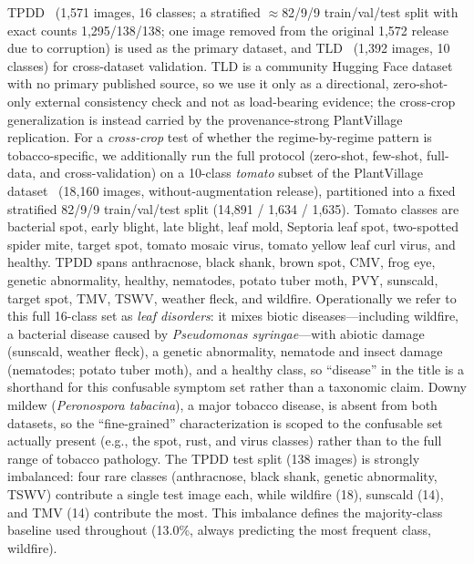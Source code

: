 \documentclass[10pt,a4paper]{article}
\begin{document}
TPDD~\cite{lin2022tpdd} (1,571 images, 16 classes; a stratified $\approx$82/9/9 train/val/test split with exact counts 1,295/138/138; one image removed from the original 1,572 release due to corruption) is used as the primary dataset, and TLD~\cite{tld} (1,392 images, 10 classes) for cross-dataset validation. TLD is a community Hugging Face dataset with no primary published source, so we use it only as a directional, zero-shot-only external consistency check and not as load-bearing evidence; the cross-crop generalization is instead carried by the provenance-strong PlantVillage replication. For a \emph{cross-crop} test of whether the regime-by-regime pattern is tobacco-specific, we additionally run the full protocol (zero-shot, few-shot, full-data, and cross-validation) on a 10-class \emph{tomato} subset of the PlantVillage dataset~\cite{plantvillage2016,plantvillage_mendeley} (18{,}160 images, without-augmentation release), partitioned into a fixed stratified 82/9/9 train/val/test split (14{,}891 / 1{,}634 / 1{,}635). Tomato classes are bacterial spot, early blight, late blight, leaf mold, Septoria leaf spot, two-spotted spider mite, target spot, tomato mosaic virus, tomato yellow leaf curl virus, and healthy.
TPDD spans anthracnose, black shank, brown spot, CMV, frog eye, genetic abnormality, healthy, nematodes, potato tuber moth, PVY, sunscald, target spot, TMV, TSWV, weather fleck, and wildfire. Operationally we refer to this full 16-class set as \emph{leaf disorders}: it mixes biotic diseases---including wildfire, a bacterial disease caused by \textit{Pseudomonas syringae}---with abiotic damage (sunscald, weather fleck), a genetic abnormality, nematode and insect damage (nematodes; potato tuber moth), and a healthy class, so ``disease'' in the title is a shorthand for this confusable symptom set rather than a taxonomic claim. Downy mildew (\textit{Peronospora tabacina}), a major tobacco disease, is absent from both datasets, so the ``fine-grained'' characterization is scoped to the confusable set actually present (e.g., the spot, rust, and virus classes) rather than to the full range of tobacco pathology.
The TPDD test split (138 images) is strongly imbalanced: four rare classes (anthracnose, black shank, genetic abnormality, TSWV) contribute a single test image each, while wildfire (18), sunscald (14), and TMV (14) contribute the most.
This imbalance defines the majority-class baseline used throughout (13.0\%, always predicting the most frequent class, wildfire).
\end{document}
